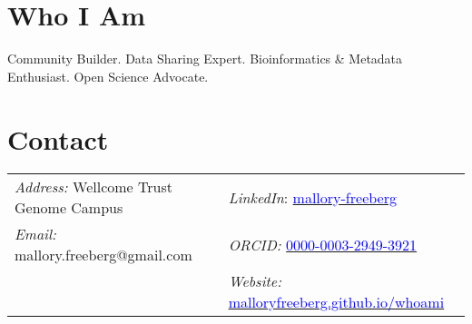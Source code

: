 \documentclass[margin,line]{res}
\begin{document}
\begin{resume}

\section{\sc Who I Am}
Community Builder. Data Sharing Expert. Bioinformatics \& Metadata Enthusiast. Open Science Advocate.

\section{\sc Contact}
\begin{tabular}{@{}p{3in}p{3in}} %
{\it Address:} Wellcome Trust Genome Campus & {\em LinkedIn}: \href{https://www.linkedin.com/in/mallory-freeberg/}{\textcolor{blue}{mallory-freeberg}} \\
{\em Email:}  mallory.freeberg@gmail.com & {\em ORCID:} \href{https://orcid.org/0000-0003-2949-3921}{\textcolor{blue}{0000-0003-2949-3921}} \\
{} & {\em Website:} \href{https://malloryfreeberg.github.io/whoami/}{\textcolor{blue}{malloryfreeberg.github.io/whoami}} \\
\end{tabular}



\end{resume}
\end{document}
